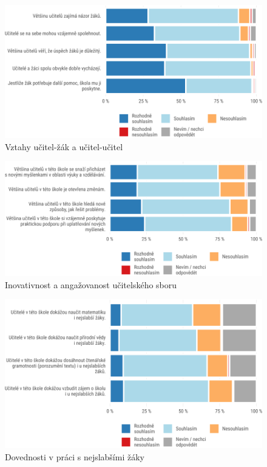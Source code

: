 \documentclass[12pt,a4paper,]{report}
\begin{document}
\begin{figure}

{\centering \includegraphics[width=\textwidth]{figs/tots1q1T3STUDappdx-1} 

}

\caption{Vztahy učitel-žák a učitel-učitel}\label{fig:tots1q1T3STUDappdx}
\end{figure}

\begin{figure}

{\centering \includegraphics[width=\textwidth]{figs/tots1q3T3TEAMappdx-1} 

}

\caption{Inovativnost a angažovanost učitelského sboru}\label{fig:tots1q3T3TEAMappdx}
\end{figure}

\begin{figure}

{\centering \includegraphics[width=\textwidth]{figs/tots1q4weakappdx-1} 

}

\caption{Dovednosti v práci s nejslabšími žáky}\label{fig:tots1q4weakappdx}
\end{figure}
\end{document}

